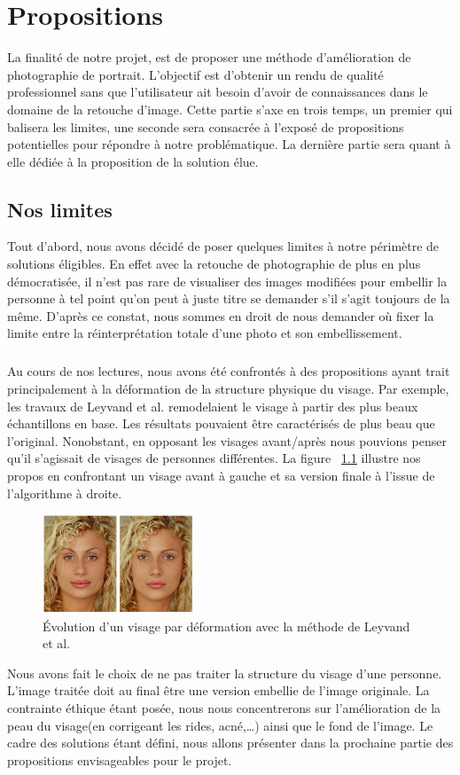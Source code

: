\documentclass[11pt, french,screen]{report-rd-info}
\begin{document}
\chapter{Propositions}
\label{chap:Propositions}
La finalité de notre projet, est de proposer une méthode d'amélioration de photographie de portrait. L’objectif est d’obtenir un rendu de qualité professionnel sans que l’utilisateur ait besoin d’avoir de connaissances dans le domaine de la retouche d’image.
Cette partie s’axe en trois temps, un premier qui balisera les limites, une seconde sera consacrée à l’exposé de propositions potentielles pour répondre à notre problématique. La dernière partie sera quant à elle dédiée à la proposition de la solution élue.
\section{Nos limites}
Tout d’abord, nous avons décidé de poser quelques limites à notre périmètre de solutions éligibles. En effet avec la retouche de photographie de plus en plus démocratisée, il n’est pas rare de visualiser des images modifiées pour embellir la personne à tel point qu’on peut à juste titre se demander s’il s’agit toujours de la même. D’après ce constat, nous sommes en droit de nous demander où fixer la limite entre la réinterprétation totale d’une photo et son embellissement.
\paragraph*{}
Au cours de nos lectures, nous avons été confrontés à des propositions ayant trait principalement à la déformation de la structure physique du visage. Par exemple, les travaux de Leyvand et al.\cite{Leyvand2008} remodelaient le visage à partir des plus beaux échantillons en base. Les résultats pouvaient être caractérisés de plus beau que l’original. Nonobstant, en opposant les visages avant/après nous pouvions penser qu’il s'agissait de visages de personnes différentes. La figure ~\ref{fig:VisagesData} illustre nos propos en confrontant un visage avant à gauche et sa version finale à l’issue de l’algorithme à droite.
\begin{figure}
	\centering
	\includegraphics[width=0.4\textwidth]{Images/ea_data_visages}
	\caption{Évolution d’un visage par déformation avec la méthode de Leyvand et al.\cite{Leyvand2008}}
	\label{fig:VisagesData}
\end{figure}
Nous avons fait le choix de ne pas traiter la structure du visage d’une personne. L’image traitée doit au final être une version embellie de l’image originale. La contrainte éthique étant posée,  nous nous concentrerons sur l’amélioration de la peau du visage(en corrigeant les rides, acné,\ldots) ainsi que le fond de l’image.
Le cadre des solutions étant défini, nous allons présenter dans la prochaine partie des propositions envisageables pour le projet.
\end{document}
